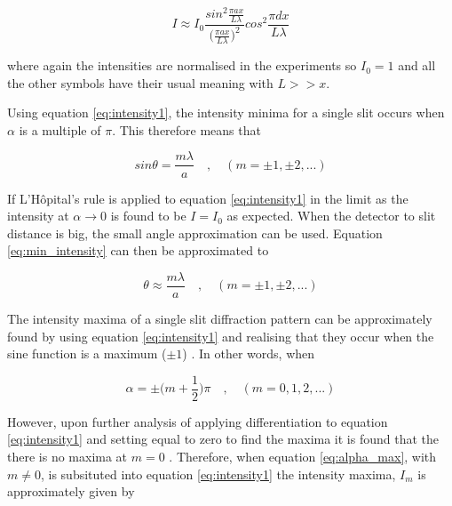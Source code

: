 \documentclass{article}
\begin{document}
\begin{equation}
\label{eq:intensity_small2}
I \approx I_0 \frac{sin^2{\frac{\pi a x}{L \lambda}}}{\big(\frac{\pi a x}{L \lambda}\big)^2} cos^2{\frac{\pi d x}{L \lambda}}
\end{equation}

\vspace{2mm}
\noindent
where again the intensities are normalised in the experiments so $I_0 = 1$ and all the other symbols have their usual meaning with $L >> x$.



\vspace{2mm}
\noindent
Using equation \eqref{eq:intensity1}, the intensity minima for a single slit occurs when $\alpha$ is a multiple of $\pi$. This therefore means that

\begin{equation}
\label{eq:min_intensity}
sin{\theta} = \frac{m \lambda}{a} \quad,\quad(m = \pm1, \pm2, ...)
\end{equation}

\vspace{2mm}
\noindent
If L'H{\^o}pital's rule \cite{Book01} is applied to equation \eqref{eq:intensity1} in the limit as the intensity at $\alpha \rightarrow 0$ is found to be $I = I_0$ as expected. When the detector to slit distance is big, the small angle approximation can be used. Equation \eqref{eq:min_intensity} can then be approximated to

\begin{equation}
\label{eq:small_angle}
\theta \approx \frac{m\lambda}{a} \quad,\quad(m = \pm1, \pm2, ...)
\end{equation}


\vspace{2mm}
\noindent
The intensity maxima of a single slit diffraction pattern can be approximately found by using equation \eqref{eq:intensity1} and realising that they occur when the sine function is a maximum ($\pm 1$) \cite{Book01}. In other words, when

\begin{equation}
\label{eq:alpha_max}
\alpha = \pm\bigg(m + \frac{1}{2}\bigg)\pi \quad,\quad(m = 0, 1, 2, ...)
\end{equation}

\vspace{2mm}
\noindent
However, upon further analysis of applying differentiation to equation \eqref{eq:intensity1} and setting equal to zero to find the maxima it is found that the there is no maxima at $m = 0$ \cite{Book01}. Therefore, when equation \eqref{eq:alpha_max}, with $m \neq 0$, is subsituted into equation \eqref{eq:intensity1} the intensity maxima, $I_m$ is approximately given by \cite{Book01}
\end{document}

